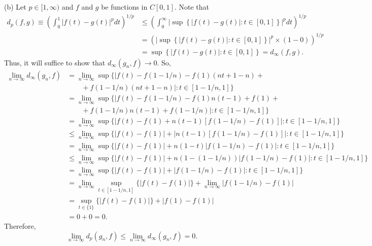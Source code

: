 \documentclass[12pt]{article}
\begin{document}
(b) Let $p \in [1, \infty)$ and $f$ and $g$ be functions in $C[0,1]$. Note that 
\begin{align*}
d_{p}(f,g) \equiv \left( \int_{0}^{1}|f(t) - g(t)|^{p}dt \right)^{1/p} & \leq \left( \int_{0}^{\infty}|\sup\left\{ |f(t) - g(t)| : t \in [0,1]
\right\}|^{p}dt \right)^{1/p} \\
& = \left( |\sup\left\{ |f(t) - g(t)| : t \in [0,1] \right\}|^{p}\times (1 - 0) \right)^{1/p} \\
& = \sup\left\{ |f(t) - g(t)| : t \in [0,1] \right\} = d_{\infty}(f,g).
\end{align*}
Thus, it will suffice to show that $d_{\infty}(g_{n}, f) \rightarrow 0$. So,
\begin{align*}
\lim_{n\rightarrow\infty}d_{\infty}(g_{n},f) & = \lim_{n\rightarrow\infty}\sup\big\{ |f(t) - f(1-1/n) - f(1)(nt + 1 - n) + \\
& \qquad + f(1-1/n)(nt + 1 -n)| : t \in [1-1/n, 1] \big\} \\
& = \lim_{n\rightarrow \infty}\sup \big\{ |f(t) - f(1-1/n) - f(1)n(t-1) + f(1) + \\
& \qquad + f(1-1/n)n(t-1) + f(1-1/n)| : t \in [1-1/n, 1]\big\} \\
& = \lim_{n\rightarrow \infty}\sup \big\{ |f(t) - f(1) + n(t-1)[f(1-1/n) - f(1)]| : t \in [1-1/n, 1]\big\} \\
& \leq \lim_{n\rightarrow \infty}\sup\big\{|f(t) - f(1)| + |n(t-1)[f(1-1/n)-f(1)]| : t \in [1-1/n, 1]\big\} \\
& = \lim_{n\rightarrow\infty}\sup\big\{|f(t) - f(1)| + n(1-t)|f(1-1/n) - f(1)| : t \in [1-1/n, 1]\big\} \\
& \leq \lim_{n\rightarrow\infty}\sup\big\{|f(t) - f(1)| + n(1-(1-1/n))|f(1-1/n) - f(1)| : t \in [1-1/n, 1]\big\} \\
& = \lim_{n\rightarrow\infty}\sup\big\{|f(t) - f(1)| + |f(1-1/n) - f(1)| : t \in [1-1/n, 1]\big\} \\
& = \lim_{n\rightarrow\infty}\sup_{t\in [1-1/n,1]}\big\{|f(t) - f(1)|\big\} + \lim_{n\rightarrow\infty}|f(1-1/n) - f(1)| \\
& = \sup_{t\in \{1\}}\big\{|f(t) - f(1)|\big\} + |f(1) - f(1)| \\
& = 0 + 0 = 0.
\end{align*}
Therefore,
\[ \lim_{n\rightarrow\infty}d_{p}(g_{n},f) \leq \lim_{n\rightarrow\infty}d_{\infty}(g_{n},f) = 0. \]
\end{document}
